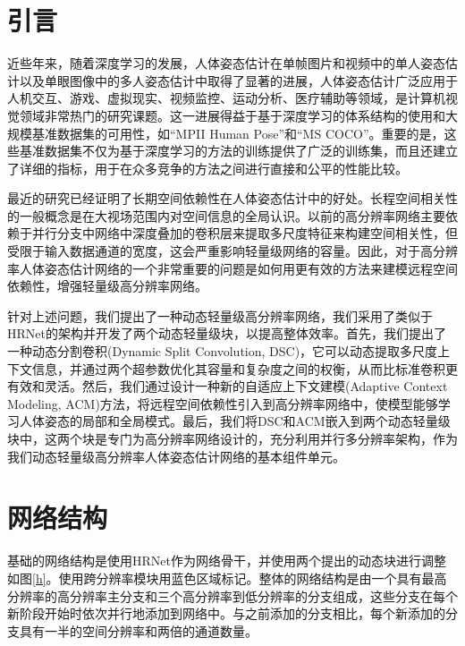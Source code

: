 \documentclass[hyperref]{ctexart}
\begin{document}
	\begin{multicols}{2}
		\section{引言}
		近些年来，随着深度学习的发展，人体姿态估计在单帧图片\cite{DBLP:conf/eccv/BulatT16}\cite{DBLP:conf/cvpr/CarreiraAFM16}\cite{DBLP:conf/nips/TompsonJLB14}\cite{DBLP:conf/cvpr/HuR16}和视频\cite{DBLP:conf/cvpr/CharlesPMHZ16}\cite{DBLP:conf/eccv/GkioxariTJ16}中的单人姿态估计以及单眼图像中的多人姿态估计\cite{DBLP:conf/cvpr/CaoSWS17}\cite{DBLP:conf/eccv/InsafutdinovPAA16}中取得了显著的进展，人体姿态估计广泛应用于人机交互、游戏、虚拟现实、视频监控、运动分析、医疗辅助等领域，是计算机视觉领域非常热门的研究课题。这一进展得益于基于深度学习的体系结构的使用\cite{DBLP:conf/cvpr/HeZRS16}\cite{DBLP:journals/corr/SimonyanZ14a}和大规模基准数据集的可用性，如“MPII Human Pose”\cite{DBLP:conf/cvpr/AndrilukaPGS14}和“MS COCO”\cite{DBLP:conf/eccv/LinMBHPRDZ14}。重要的是，这些基准数据集不仅为基于深度学习的方法的训练提供了广泛的训练集，而且还建立了详细的指标，用于在众多竞争的方法之间进行直接和公平的性能比较。
	
		最近的研究\cite{chen2018cascaded}已经证明了长期空间依赖性在人体姿态估计中的好处。长程空间相关性的一般概念是在大视场范围内对空间信息的全局认识。以前的高分辨率网络\cite{chen2018cascaded}\cite{DBLP:conf/cvpr/YuXGY0S021}\cite{DBLP:journals/pami/00010CJDZ0MTW0X21}主要依赖于并行分支中网络中深度叠加的卷积层来提取多尺度特征来构建空间相关性，但受限于输入数据通道的宽度，这会严重影响轻量级网络的容量。因此，对于高分辨率人体姿态估计网络的一个非常重要的问题是如何用更有效的方法来建模远程空间依赖性，增强轻量级高分辨率网络。
		
		针对上述问题，我们提出了一种动态轻量级高分辨率网络，我们采用了类似于HRNet的架构并开发了两个动态轻量级块，以提高整体效率。首先，我们提出了一种动态分割卷积(Dynamic Split Convolution, DSC)，它可以动态提取多尺度上下文信息，并通过两个超参数优化其容量和复杂度之间的权衡，从而比标准卷积更有效和灵活。然后，我们通过设计一种新的自适应上下文建模(Adaptive Context Modeling, ACM)方法，将远程空间依赖性引入到高分辨率网络中，使模型能够学习人体姿态的局部和全局模式。最后，我们将DSC和ACM嵌入到两个动态轻量级块中，这两个块是专门为高分辨率网络设计的，充分利用并行多分辨率架构，作为我们动态轻量级高分辨率人体姿态估计网络的基本组件单元。
		
		\section{网络结构}
		基础的网络结构是使用HRNet\cite{DBLP:conf/cvpr/0009XLW19}作为网络骨干，并使用两个提出的动态块进行调整如图\ref{h}。使用跨分辨率模块用蓝色区域标记。整体的网络结构是由一个具有最高分辨率的高分辨率主分支和三个高分辨率到低分辨率的分支组成，这些分支在每个新阶段开始时依次并行地添加到网络中。与之前添加的分支相比，每个新添加的分支具有一半的空间分辨率和两倍的通道数量。
	\end{multicols}
\end{document}
